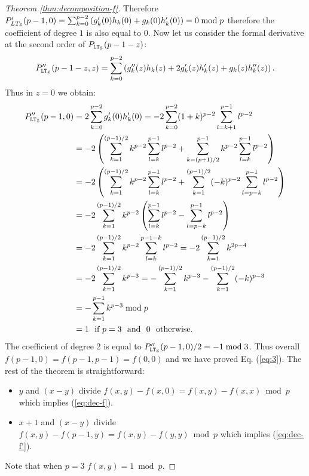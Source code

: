 \begin{proof}[Theorem \ref{thm:decomposition-f}]
Therefore $P'_{LT_\S}(p-1,0) = \sum_{k=0}^{p-2}\left(g_k'(0)h_k(0) + g_k(0)h'_k(0) \right) = 0 \bmod p$ therefore the coefficient of degree $1$ is also equal to $0$. 
Now let us consider the formal derivative at the second order of $P_{\LT_\S}(p-1-z)$:
$$P''_{\LT_\S}(p-1-z,z) = \sum_{k=0}^{p-2}\left(g_k''(z)h_k(z) + 2g_k'(z)h'_k(z) + g_k(z)h''_k(z) \right).$$
Thus in $z=0$ we obtain: 
\begin{align*}
  P''_{\LT_\S}(p-1,0) & = 2\sum_{k=0}^{p-2}g_k'(0)h'_k(0) = -2\sum_{k=0}^{p-2}(1+k)^{p-2}\sum_{l=k+1}^{p-1}l^{p-2} \\
                      &= -2\left(\sum_{k=1}^{(p-1)/2}k^{p-2}\sum_{l=k}^{p-1}l^{p-2} + \sum_{k=(p+1)/2}^{p-1}k^{p-2}\sum_{l=k}^{p-1}l^{p-2}\right) \\
                      & = -2\left(\sum_{k=1}^{(p-1)/2}k^{p-2}\sum_{l=k}^{p-1}l^{p-2} + \sum_{k=1}^{(p-1)/2}(-k)^{p-2}\sum_{l=p-k}^{p-1}l^{p-2}\right) \\
                      & = -2\sum_{k=1}^{(p-1)/2}k^{p-2}\left(\sum_{l=k}^{p-1}l^{p-2} -  \sum_{l=p-k}^{p-1}l^{p-2}\right) \\
                      & = -2\sum_{k=1}^{(p-1)/2}k^{p-2}\sum_{l=k}^{p-1-k}l^{p-2} = -2\sum_{k=1}^{(p-1)/2}k^{2p-4} \\
                      & = -2\sum_{k=1}^{(p-1)/2}k^{p-3} = -\sum_{k=1}^{(p-1)/2}k^{p-3} - \sum_{k=1}^{(p-1)/2}(-k)^{p-3} \\
                      & = -\sum_{k=1}^{p-1}k^{p-3}  \bmod p\\
                      & = 1 ~\text{ if } p = 3 ~\text{ and }~ 0 ~\text{ otherwise.}
\end{align*}
The coefficient of degree 2 is equal to $P''_{\LT_\S}(p-1,0)/2 = -1 \bmod 3$.
Thus overall $f(p-1,0) = f(p-1,p-1) = f(0,0)$ and we have proved Eq. (\ref{eq:3}). The rest of the theorem is straightforward:
\begin{itemize}
\item $y$ and $(x-y)$ divide $f(x,y)-f(x,0) = f(x,y)-f(x,x) \bmod p$ which implies (\ref{eq:dec-f}). 
\item $x+1$ and $(x-y)$ divide $f(x,y)-f(p-1,y) = f(x,y)-f(y,y) \bmod p$ which implies (\ref{eq:dec-f'}).
\end{itemize}
Note that when $p=3$ $f(x,y) = 1 \bmod p.$
\end{proof}

